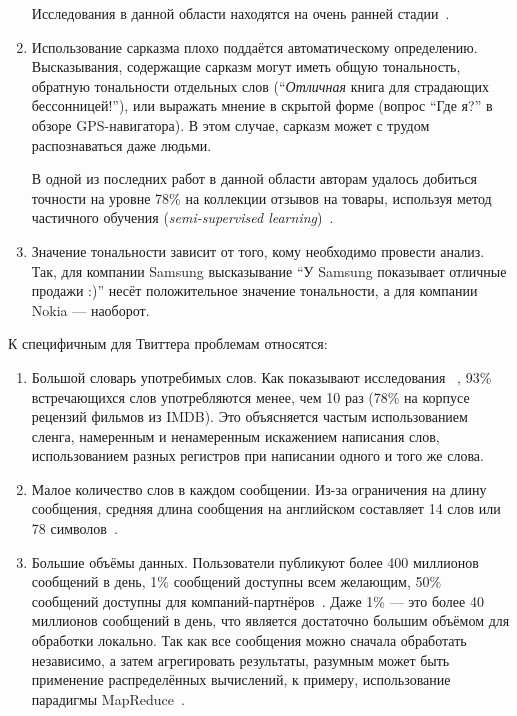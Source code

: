 \begin{enumerate}
Исследования в данной области находятся на очень ранней стадии~\cite{Wiegand2010}.

\item 
Использование сарказма плохо поддаётся автоматическому определению. 
Высказывания, содержащие сарказм могут иметь общую тональность, 
обратную тональности отдельных слов 
(``\textit{Отличная} книга для страдающих бессонницей!''), 
или выражать мнение в скрытой форме (вопрос ``Где я?'' 
в обзоре GPS-навигатора). В этом случае, сарказм может с трудом распознаваться даже людьми. 

В одной из последних работ в данной области авторам удалось 
добиться точности на уровне 78\% на коллекции отзывов на товары, используя 
метод частичного обучения (\textit{semi-supervised learning})~\cite{Tsur2010}.

\item 
Значение тональности зависит от того, кому необходимо провести анализ. 
Так, для компании Samsung высказывание ``У Samsung показывает отличные продажи :)'' несёт положительное значение тональности, а для компании Nokia --- наоборот.

\end{enumerate}

\vspace{0.5cm}

К специфичным для Твиттера проблемам относятся:

\begin{enumerate}

\item 
Большой словарь употребимых слов.  
Как показывают исследования~\cite{Saif2012}	, 93\% встречающихся слов 
употребляются менее, чем 10 раз (78\% на корпусе рецензий фильмов из IMDB). 
Это объясняется частым использованием сленга, намеренным и ненамеренным искажением написания слов, использованием разных регистров при написании одного и того же слова.

\item 
Малое количество слов в каждом сообщении. 
Из-за ограничения на длину сообщения, средняя длина сообщения на 
английском составляет 14 слов или 78 символов~\cite{Go2009}.

\item 
Большие объёмы данных. 
Пользователи публикуют более 400 миллионов сообщений в день, 
1\% сообщений доступны всем желающим, 
50\% сообщений доступны для компаний-партнёров~\cite{streaming}. 
Даже 1\% --- это более 40 миллионов сообщений в день, что является 
достаточно большим объёмом для обработки локально. 
Так как все сообщения можно сначала обработать независимо, 
а затем агрегировать результаты, 	разумным 
может быть применение распределённых вычислений, к примеру, 
использование парадигмы MapReduce~\cite{Lin2012, sentiment_mapreduce}.

\end{enumerate}